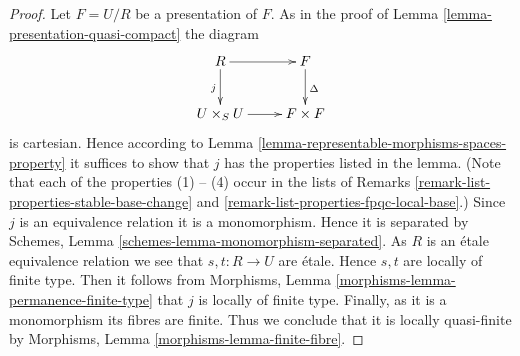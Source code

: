 \documentclass[10pt,a4paper]{amsart}
\theoremstyle{plain}
\theoremstyle{definition}
\theoremstyle{remark}
\numberwithin{equation}{subsection}
\begin{document}
\begin{proof}
Let $F = U/R$ be a presentation of $F$.
As in the proof of Lemma \ref{lemma-presentation-quasi-compact} the diagram
$$
\xymatrix{
R \ar[r] \ar[d]_j & F \ar[d]^\Delta \\
U \times_S U \ar[r] & F \times F
}
$$
is cartesian. Hence according to
Lemma \ref{lemma-representable-morphisms-spaces-property}
it suffices to show that $j$ has the properties listed in the lemma.
(Note that each of the properties (1) -- (4) occur in the lists
of Remarks \ref{remark-list-properties-stable-base-change}
and \ref{remark-list-properties-fpqc-local-base}.)
Since $j$ is an equivalence relation it is a monomorphism.
Hence it is separated by
Schemes, Lemma \ref{schemes-lemma-monomorphism-separated}.
As $R$ is an \'etale equivalence relation we see that
$s, t : R \to U$ are \'etale. Hence $s, t$ are locally of finite
type. Then it follows from
Morphisms, Lemma \ref{morphisms-lemma-permanence-finite-type} that
$j$ is locally of finite type. Finally, as it is a monomorphism
its fibres are finite. Thus we conclude that it is locally quasi-finite by
Morphisms, Lemma \ref{morphisms-lemma-finite-fibre}.
\end{proof}
\end{document}

